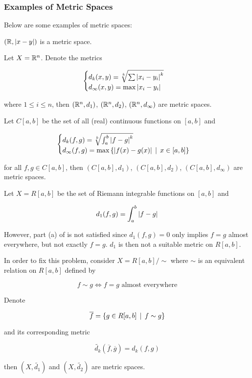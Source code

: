 \documentclass[a4paper,12pt]{article}
\begin{document}
\subsubsection{Examples of Metric Spaces}
\begin{exm}
  Below are some examples of metric spaces:

  \begin{alist}
    \item $(\mathbb{R},\left| x-y\right|)$ is a metric space.
    \item Let $X=\mathbb{R}^{n}$. Denote the metrics
    
    $$\begin{cases}
      d_{k}(x,y)=\sqrt[k]{\sum\left| x_{i}-y_{i}\right|^{k}}\\
      d_{\infty}(x,y)=\max\left| x_{i}-y_{i}\right|
    \end{cases}$$\s

    where $1\leq i\leq n$, then $(\mathbb{R}^{n},d_{1})$, $(\mathbb{R}^{n},d_{2})$, $(\mathbb{R}^{n},d_{\infty})$ are metric spaces.
    \item Let $C[a,b]$ be the set of all (real) continuous functions on $[a,b]$ and
    
    $$\begin{cases}
      d_{k}(f,g)=\sqrt[k]{\int_{a}^{b}\left| f-g\right|^{k}}\\
      d_{\infty}(f,g)=\max\left\{ \left| f(x)-g(x)\right|\,\mid\, x\in[a,b]\right\}
    \end{cases}$$\s

    for all $f,g\in C[a,b]$, then $(C[a,b], d_{1})$, $(C[a,b], d_{2})$, $(C[a,b], d_{\infty})$ are metric spaces.
  \end{alist}
\end{exm}\n

\begin{exm}
  Let $X=R[a,b]$ be the set of Riemann integrable functions on $[a,b]$ and

  $$d_{1}(f,g)=\int_{a}^{b}\left| f-g\right|$$\s

  However, part (a) of \rdft[\sctr{3}] is not satisfied since $d_{1}(f,g)=0$ only implies $f=g$ almost everywhere, but not exactly $f=g$. $d_{1}$ is then not a suitable metric on $R[a,b]$.\n

  In order to fix this problem, consider $X=R[a,b]/\sim$ where $\sim$ is an equivalent relation on $R[a,b]$ defined by

  $$f\sim g\Leftrightarrow f=g\text{ almost everywhere}$$\s

  Denote
  
  $$\overline{f}=\left\{ g\in R[a,b]\,\mid\, f\sim g\right\}$$\s

  and its corresponding metric

  $$\tilde{d_{k}}(\overline{f},\overline{g})=d_{k}(f,g)$$\s

  then $(X,\tilde{d_{1}})$ and $(X,\tilde{d_{2}})$ are metric spaces.
\end{exm}\n
\end{document}
